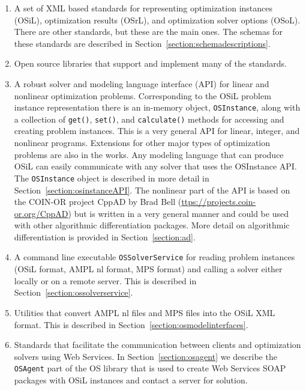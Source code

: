 \documentclass[11pt]{article}
\renewcommand{\_}{{\char"5F}}
\renewcommand{\{}{{\char"7B}}
\renewcommand{\}}{{\char"7D}}
\renewcommand{\^}{{\char"0D}}
\renewcommand{\'}{{\char"0D}}
\begin{document}
\begin{enumerate}
\item{}  A set of XML based standards for representing optimization instances (OSiL), optimization results (OSrL), 
and optimization solver options (OSoL). There are other standards, but these are the main ones. The schemas for 
these standards are described in Section~\ref{section:schemadescriptions}.


\item{}  Open source libraries  that support and implement many of the standards.

\item{}  A robust solver and modeling language interface (API) for linear and nonlinear optimization problems.  
Corresponding to the OSiL problem instance representation there is an in-memory object,  
{\tt OSInstance}, 
along with a collection of  {\tt get()},   {\tt set()}, and {\tt calculate()} methods for accessing and creating 
problem instances. This is a very general API for linear, integer, and nonlinear programs. 
Extensions for other major types of optimization problems are also in the works. Any modeling language that can 
produce OSiL can easily communicate with any solver that uses the OSInstance API.   The {\tt OSInstance} object 
is described in more detail in Section~\ref{section:osinstanceAPI}. The nonlinear part of the API is based on the 
COIN-OR project CppAD by Brad Bell (\url{ttps://projects.coin-or.org/CppAD}) but is written in a very general 
manner and could be used with other algorithmic differentiation packages. More detail on algorithmic differentiation 
is provided in Section~\ref{section:ad}.


\item{}  A  command line executable {\tt OSSolverService}  for reading 
problem instances (OSiL format, AMPL  nl format,  MPS format) and calling a solver either locally or on a remote server.  
This is described in Section~\ref{section:ossolverservice}.


\item{} Utilities that convert AMPL nl files  and MPS files into the OSiL XML format.  
This is described in Section~\ref{section:osmodelinterfaces}.


\item{}  Standards that facilitate the communication between clients and optimization solvers using Web Services.  
In  Section~\ref{section:osagent} we describe the {\tt OSAgent} part of the OS library 
that is used to create Web Services SOAP packages with OSiL instances and contact a server for solution.


\end{enumerate}
\end{document}
